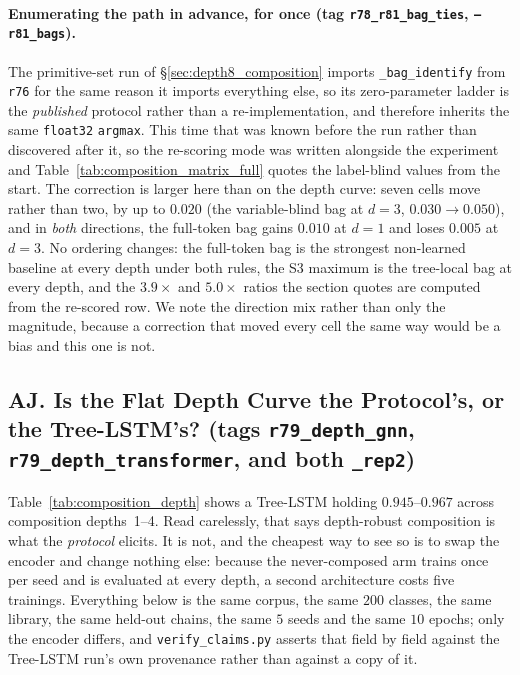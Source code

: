 \paragraph{Enumerating the path in advance, for once (tag \texttt{r78\_r81\_bag\_ties}, \texttt{--r81\_bags}).} The primitive-set run of \S\ref{sec:depth8_composition} imports \texttt{\_bag\_identify} from \texttt{r76} for the same reason it imports everything else, so its zero-parameter ladder is the \emph{published} protocol rather than a re-implementation, and therefore inherits the same \texttt{float32} \texttt{argmax}. This time that was known before the run rather than discovered after it, so the re-scoring mode was written alongside the experiment and Table~\ref{tab:composition_matrix_full} quotes the label-blind values from the start. The correction is larger here than on the depth curve: seven cells move rather than two, by up to $0.020$ (the variable-blind bag at $d{=}3$, $0.030 \to 0.050$), and in \emph{both} directions, the full-token bag gains $0.010$ at $d{=}1$ and loses $0.005$ at $d{=}3$. No ordering changes: the full-token bag is the strongest non-learned baseline at every depth under both rules, the S3 maximum is the tree-local bag at every depth, and the $3.9\times$ and $5.0\times$ ratios the section quotes are computed from the re-scored row. We note the direction mix rather than only the magnitude, because a correction that moved every cell the same way would be a bias and this one is not.

\subsection*{AJ. Is the Flat Depth Curve the Protocol's, or the Tree-LSTM's? (tags \texttt{r79\_depth\_gnn}, \texttt{r79\_depth\_transformer}, and both \texttt{\_rep2})}

Table~\ref{tab:composition_depth} shows a Tree-LSTM holding $0.945$--$0.967$ across composition depths~1--4. Read carelessly, that says depth-robust composition is what the \emph{protocol} elicits. It is not, and the cheapest way to see so is to swap the encoder and change nothing else: because the never-composed arm trains once per seed and is evaluated at every depth, a second architecture costs five trainings. Everything below is the same corpus, the same $200$ classes, the same library, the same held-out chains, the same $5$ seeds and the same $10$ epochs; only the encoder differs, and \texttt{verify\_claims.py} asserts that field by field against the Tree-LSTM run's own provenance rather than against a copy of it.

